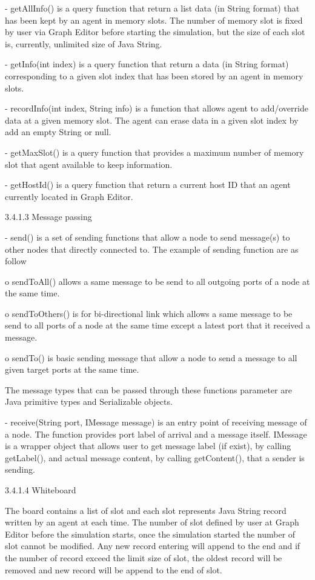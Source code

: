 \begin{description}
\begin{description}
\begin{description}
\begin{description}
- getAllInfo() is a query function that return a list data (in String format) that has been kept by an agent in memory slots. The number of memory slot is fixed by user via Graph Editor before starting the simulation, but the size of each slot is, currently, unlimited size of Java String.

- getInfo(int index) is a query function that return a data (in String format) corresponding to a given slot index that has been stored by an agent in memory slots.

- recordInfo(int index, String info) is a function that allows agent to add/override data at a given memory slot. The agent can erase data in a given slot index by add an empty String or null.

- getMaxSlot() is a query function that provides a maximum number of memory slot that agent available to keep information.

- getHostId() is a query function that return a current host ID that an agent currently located in Graph Editor.

3.4.1.3 Message passing

-	send() is a set of sending functions that allow a node to send message(s) to other nodes that directly connected to. The example of sending function are as follow

o	sendToAll() allows a same message to be send to all outgoing ports of a node at the same time.

o	sendToOthers() is for bi-directional link which allows a same message to be send to all ports of a node at the same time except a latest port that it received a message.

o	sendTo() is basic sending message that allow a node to send a message to all given target ports at the same time.

 The message types that can be passed through these functions parameter are Java primitive types and Serializable objects.

- receive(String port, IMessage message) is an entry point of receiving message of a node. The function provides port label of arrival and a message itself. IMessage is a wrapper object that allows user to get message label (if exist), by calling getLabel(), and actual message content, by calling getContent(), that a sender is sending.


3.4.1.4 Whiteboard

The board contains a list of slot and each slot represents Java String record written by an agent at each time. The number of slot defined by user at Graph Editor before the simulation starts, once the simulation started the number of slot cannot be modified. Any new record entering will append to the end and if the number of record exceed the limit size of slot, the oldest record will be removed and new record will be append to the end of slot.


\end{description}
\end{description}
\end{description}
\end{description}
